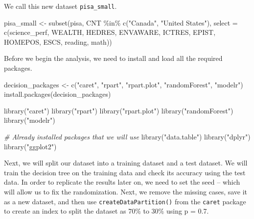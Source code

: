 \documentclass[
]{book}
\newenvironment{Shaded}{\begin{snugshade}}{\end{snugshade}}
\newcommand{\AttributeTok}[1]{\textcolor[rgb]{0.77,0.63,0.00}{#1}}
\newcommand{\CommentTok}[1]{\textcolor[rgb]{0.56,0.35,0.01}{\textit{#1}}}
\newcommand{\FunctionTok}[1]{\textcolor[rgb]{0.00,0.00,0.00}{#1}}
\newcommand{\NormalTok}[1]{#1}
\newcommand{\OtherTok}[1]{\textcolor[rgb]{0.56,0.35,0.01}{#1}}
\newcommand{\SpecialCharTok}[1]{\textcolor[rgb]{0.00,0.00,0.00}{#1}}
\newcommand{\StringTok}[1]{\textcolor[rgb]{0.31,0.60,0.02}{#1}}
\begin{document}
We call this new dataset \texttt{pisa\_small}.

\begin{Shaded}
\begin{Highlighting}[]
\NormalTok{pisa\_small }\OtherTok{\textless{}{-}} \FunctionTok{subset}\NormalTok{(pisa, CNT }\SpecialCharTok{\%in\%} \FunctionTok{c}\NormalTok{(}\StringTok{"Canada"}\NormalTok{, }\StringTok{"United States"}\NormalTok{), }
                     \AttributeTok{select =} \FunctionTok{c}\NormalTok{(science\_perf, WEALTH, HEDRES, ENVAWARE, ICTRES, }
\NormalTok{                                EPIST, HOMEPOS, ESCS, reading, math))}
\end{Highlighting}
\end{Shaded}

Before we begin the analysis, we need to install and load all the required packages.

\begin{Shaded}
\begin{Highlighting}[]
\NormalTok{decision\_packages }\OtherTok{\textless{}{-}} \FunctionTok{c}\NormalTok{(}\StringTok{"caret"}\NormalTok{, }\StringTok{"rpart"}\NormalTok{, }\StringTok{"rpart.plot"}\NormalTok{, }\StringTok{"randomForest"}\NormalTok{, }\StringTok{"modelr"}\NormalTok{)}
\FunctionTok{install.packages}\NormalTok{(decision\_packages)}

\FunctionTok{library}\NormalTok{(}\StringTok{"caret"}\NormalTok{)}
\FunctionTok{library}\NormalTok{(}\StringTok{"rpart"}\NormalTok{)}
\FunctionTok{library}\NormalTok{(}\StringTok{"rpart.plot"}\NormalTok{)}
\FunctionTok{library}\NormalTok{(}\StringTok{"randomForest"}\NormalTok{)}
\FunctionTok{library}\NormalTok{(}\StringTok{"modelr"}\NormalTok{)}

\CommentTok{\# Already installed packages that we will use}
\FunctionTok{library}\NormalTok{(}\StringTok{"data.table"}\NormalTok{)}
\FunctionTok{library}\NormalTok{(}\StringTok{"dplyr"}\NormalTok{)}
\FunctionTok{library}\NormalTok{(}\StringTok{"ggplot2"}\NormalTok{)}
\end{Highlighting}
\end{Shaded}

Next, we will split our dataset into a training dataset and a test dataset. We will train the decision tree on the training data and check its accuracy using the test data. In order to replicate the results later on, we need to set the seed -- which will allow us to fix the randomization. Next, we remove the missing cases, save it as a new dataset, and then use \texttt{createDataPartition()} from the \texttt{caret} package to create an index to split the dataset as 70\% to 30\% using p = 0.7.
\end{document}
